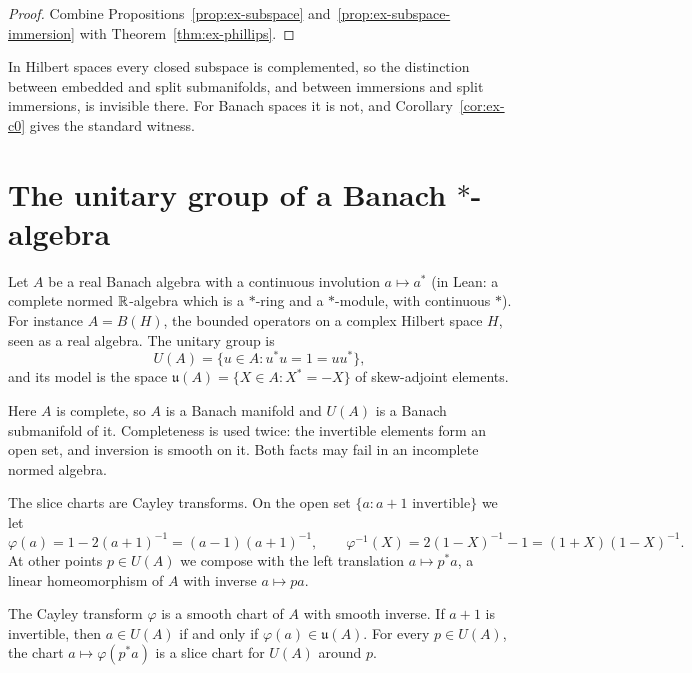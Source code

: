 \begin{proof}
  \leanok
  Combine Propositions~\ref{prop:ex-subspace} and~\ref{prop:ex-subspace-immersion} with
  Theorem~\ref{thm:ex-phillips}.
\end{proof}

\begin{remark}
  In Hilbert spaces every closed subspace is complemented, so the distinction between embedded
  and split submanifolds, and between immersions and split immersions, is invisible there. For
  Banach spaces it is not, and Corollary~\ref{cor:ex-c0} gives the standard witness.
\end{remark}

\section{The unitary group of a Banach \texorpdfstring{$*$}{*}-algebra}

Let $A$ be a real Banach algebra with a continuous involution $a \mapsto a^*$ (in Lean:
a complete normed $\mathbb{R}$-algebra which is a $*$-ring and a $*$-module, with continuous $*$). For
instance $A = B(H)$, the bounded operators on a complex Hilbert space $H$, seen as a real
algebra. The unitary group is
\[
  U(A) = \{u \in A : u^* u = 1 = u u^*\},
\]
and its model is the space $\mathfrak u(A) = \{X \in A : X^* = -X\}$ of skew-adjoint elements.

\begin{remark}[Completeness]
  Here $A$ is complete, so $A$ is a Banach manifold and $U(A)$ is a Banach submanifold of it.
  Completeness is used twice: the invertible elements form an open set, and inversion is smooth
  on it. Both facts may fail in an incomplete normed algebra.
\end{remark}

The slice charts are Cayley transforms. On the open set $\{a : a + 1 \text{ invertible}\}$ we
let
\[
  \varphi(a) = 1 - 2(a + 1)^{-1} = (a - 1)(a + 1)^{-1}, \qquad
  \varphi^{-1}(X) = 2(1 - X)^{-1} - 1 = (1 + X)(1 - X)^{-1}.
\]
At other points $p \in U(A)$ we compose with the left translation $a \mapsto p^* a$, a linear
homeomorphism of $A$ with inverse $a \mapsto pa$.

\begin{lemma}
  \label{lem:ex-cayley}
  \leanok
  The Cayley transform $\varphi$ is a smooth chart of $A$ with smooth inverse. If $a + 1$ is
  invertible, then $a \in U(A)$ if and only if $\varphi(a) \in \mathfrak u(A)$. For every
  $p \in U(A)$, the chart $a \mapsto \varphi(p^* a)$ is a slice chart for $U(A)$ around $p$.
\end{lemma}

